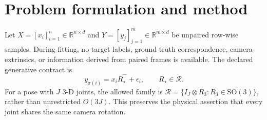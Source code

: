 \documentclass[10pt,a4paper]{article}
\newcommand{\R}{\mathbb R}\newcommand{\SO}{\mathrm{SO}}\newcommand{\norm}[1]{\lVert#1\rVert}
\begin{document}
\section{Problem formulation and method}
Let $X=[x_i]_{i=1}^n\in\R^{n\times d}$ and $Y=[y_j]_{j=1}^m\in\R^{m\times d}$ be unpaired row-wise samples. During fitting, no target labels, ground-truth correspondence, camera extrinsics, or information derived from paired frames is available. The declared generative contract is
\begin{equation}y_{\pi(i)}=x_iR_\star^\top+\epsilon_i,\qquad R_\star\in\mathcal R.\end{equation}
For a pose with $J$ 3-D joints, the allowed family is $\mathcal R=\{I_J\otimes R_3:R_3\in\SO(3)\}$, rather than unrestricted $O(3J)$. This preserves the physical assertion that every joint shares the same camera rotation.

\end{document}
